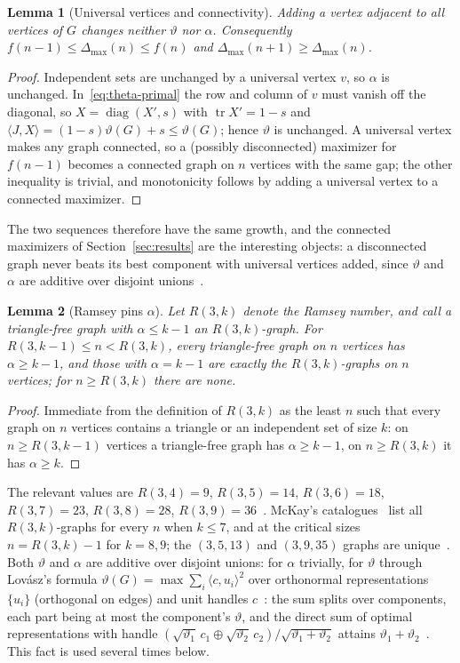 \documentclass[11pt]{article}
\newtheorem{lemma}{Lemma}
\renewcommand{\theta}{\vartheta}
\newcommand{\gap}{\Delta}
\begin{document}
\begin{lemma}[Universal vertices and connectivity]\label{lem:mono}
Adding a vertex adjacent to all vertices of $G$ changes neither $\theta$ nor $\alpha$. Consequently $f(n-1)\le\gap_{\max}(n)\le f(n)$ and $\gap_{\max}(n+1)\ge\gap_{\max}(n)$.
\end{lemma}
\begin{proof}
Independent sets are unchanged by a universal vertex $v$, so $\alpha$ is unchanged. In~\eqref{eq:theta-primal} the row and column of $v$ must vanish off the diagonal, so $X=\operatorname{diag}(X',s)$ with $\operatorname{tr}X'=1-s$ and $\langle J,X\rangle=(1-s)\theta(G)+s\le\theta(G)$; hence $\theta$ is unchanged. A universal vertex makes any graph connected, so a (possibly disconnected) maximizer for $f(n-1)$ becomes a connected graph on $n$ vertices with the same gap; the other inequality is trivial, and monotonicity follows by adding a universal vertex to a connected maximizer.
\end{proof}
The two sequences therefore have the same growth, and the connected maximizers of Section~\ref{sec:results} are the interesting objects: a disconnected graph never beats its best component with universal vertices added, since $\theta$ and $\alpha$ are additive over disjoint unions~\cite{knuth1994}.

\begin{lemma}[Ramsey pins $\alpha$]\label{lem:ramsey}
Let $R(3,k)$ denote the Ramsey number, and call a triangle-free graph with $\alpha\le k-1$ an $R(3,k)$-graph. For $R(3,k-1)\le n<R(3,k)$, every triangle-free graph on $n$ vertices has $\alpha\ge k-1$, and those with $\alpha=k-1$ are exactly the $R(3,k)$-graphs on $n$ vertices; for $n\ge R(3,k)$ there are none.
\end{lemma}
\begin{proof}
Immediate from the definition of $R(3,k)$ as the least $n$ such that every graph on $n$ vertices contains a triangle or an independent set of size $k$: on $n\ge R(3,k-1)$ vertices a triangle-free graph has $\alpha\ge k-1$, on $n\ge R(3,k)$ it has $\alpha\ge k$.
\end{proof}

The relevant values are $R(3,4)=9$, $R(3,5)=14$, $R(3,6)=18$, $R(3,7)=23$, $R(3,8)=28$, $R(3,9)=36$~\cite{radziszowski}. McKay's catalogues~\cite{mckay-ramsey,goedgebeur2013} list all $R(3,k)$-graphs for every $n$ when $k\le7$, and at the critical sizes $n=R(3,k)-1$ for $k=8,9$; the $(3,5,13)$ and $(3,9,35)$ graphs are unique~\cite{radziszowski}. Both $\theta$ and $\alpha$ are additive over disjoint unions: for $\alpha$ trivially, for $\theta$ through Lov\'asz's formula $\theta(G)=\max\sum_i\langle c,u_i\rangle^2$ over orthonormal representations $\{u_i\}$ (orthogonal on edges) and unit handles $c$~\cite{lovasz1979}: the sum splits over components, each part being at most the component's $\theta$, and the direct sum of optimal representations with handle $(\sqrt{\theta_1}\,c_1\oplus\sqrt{\theta_2}\,c_2)/\sqrt{\theta_1+\theta_2}$ attains $\theta_1+\theta_2$~\cite{knuth1994}. This fact is used several times below.
\end{document}

